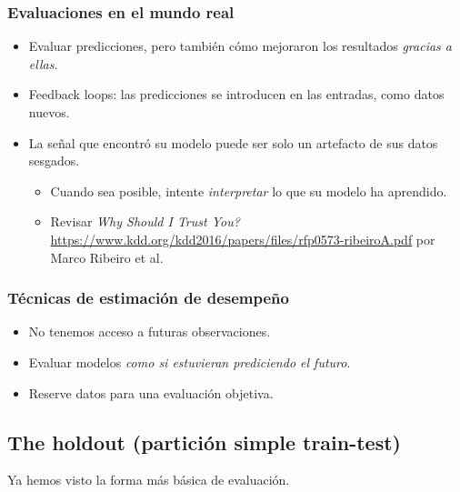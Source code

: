\documentclass[a4paper, 11pt]{article}
\begin{document}
\subsubsection{Evaluaciones en el mundo real}
\begin{itemize}
    \item Evaluar predicciones, pero también cómo mejoraron los resultados \textit{gracias a ellas}.
    \item Feedback loops: las predicciones se introducen en las entradas, como datos nuevos.
    \item La señal que encontró su modelo puede ser solo un artefacto de sus datos sesgados.
    \begin{itemize}
        \item Cuando sea posible, intente \textit{interpretar} lo que su modelo ha aprendido.
        \item Revisar \textit{Why Should I Trust You?} \url{https://www.kdd.org/kdd2016/papers/files/rfp0573-ribeiroA.pdf} por Marco Ribeiro et al.
    \end{itemize}
\end{itemize}

\subsubsection{Técnicas de estimación de desempeño}
\begin{itemize}
    \item No tenemos acceso a futuras observaciones.
    \item Evaluar modelos \textit{como si estuvieran prediciendo el futuro}.
    \item Reserve datos para una evaluación objetiva.
\end{itemize}

\subsection{The holdout (partición simple train-test)}
Ya hemos visto la forma más básica de evaluación.
\end{document}

